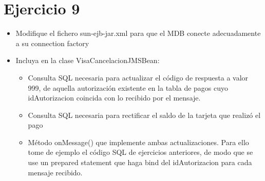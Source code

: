 \documentclass[a4paper, 10pt]{article}
\begin{document}
\newpage
\section{Ejercicio 9}
\begin{mdframed}
\begin{itemize}
\item Modifique el fichero sun-ejb-jar.xml para que el MDB conecte adecuadamente a su connection factory
\item Incluya en la clase VisaCancelacionJMSBean:
\begin{itemize}
\item Consulta SQL necesaria para actualizar el código de respuesta a valor 999, de aquella
autorización existente en la tabla de pagos cuyo idAutorizacion coincida con lo recibido por el mensaje.
\item Consulta SQL necesaria para rectificar el saldo de la tarjeta que realizó el pago

\item Método onMessage() que implemente ambas actualizaciones. Para ello tome de ejemplo el
código SQL de ejercicios anteriores, de modo que se use un prepared statement que haga bind
del idAutorizacion para cada mensaje recibido.
\end{itemize}

\end{itemize}
\end{mdframed}
\end{document}

